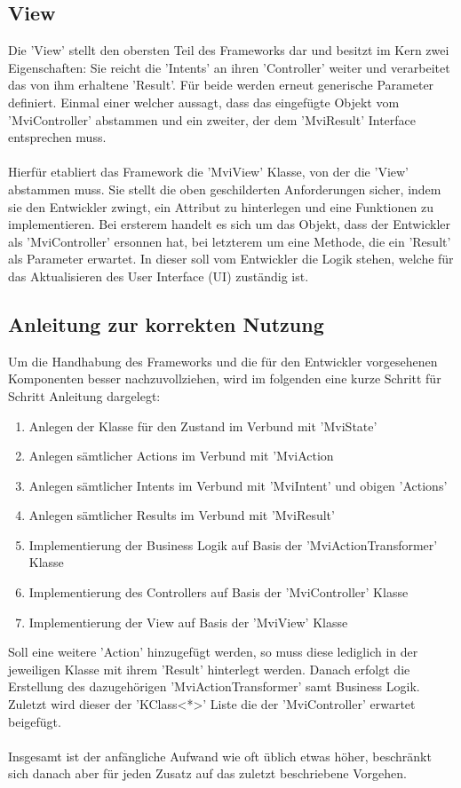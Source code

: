 \subsection{View}
Die 'View' stellt den obersten Teil des Frameworks dar und besitzt im Kern zwei Eigenschaften: Sie reicht die 'Intents' an ihren 'Controller' weiter und verarbeitet das von ihm erhaltene 'Result'. Für beide werden erneut generische Parameter definiert. Einmal einer welcher aussagt, dass das eingefügte Objekt vom 'MviController' abstammen und ein zweiter, der dem 'MviResult' Interface entsprechen muss.
\\\\
Hierfür etabliert das Framework die 'MviView' Klasse, von der die 'View' abstammen muss. Sie stellt die oben geschilderten Anforderungen sicher, indem sie den Entwickler zwingt, ein Attribut zu hinterlegen und eine Funktionen zu implementieren. Bei ersterem handelt es sich um das Objekt, dass der Entwickler als 'MviController' ersonnen hat, bei letzterem um eine Methode, die ein 'Result' als Parameter erwartet. In dieser soll vom Entwickler die Logik stehen, welche für das Aktualisieren des User Interface (UI) zuständig ist. 

\subsection{Anleitung zur korrekten Nutzung}
Um die Handhabung des Frameworks und die für den Entwickler vorgesehenen Komponenten besser nachzuvollziehen, wird im folgenden eine kurze Schritt für Schritt Anleitung dargelegt:
\begin{enumerate}
	\item Anlegen der Klasse für den Zustand im Verbund mit 'MviState'
	\item Anlegen sämtlicher Actions im Verbund mit 'MviAction
	\item Anlegen sämtlicher Intents im Verbund mit 'MviIntent' und obigen 'Actions'
	\item Anlegen sämtlicher Results im Verbund mit 'MviResult'
	\item Implementierung der Business Logik auf Basis der 'MviActionTransformer' Klasse
	\item Implementierung des Controllers auf Basis der 'MviController' Klasse
	\item Implementierung der View auf Basis der 'MviView' Klasse
\end{enumerate}
\bigskip
Soll eine weitere 'Action' hinzugefügt werden, so muss diese lediglich in der jeweiligen Klasse mit ihrem 'Result' hinterlegt werden. Danach erfolgt die Erstellung des dazugehörigen 'MviActionTransformer' samt Business Logik. Zuletzt wird dieser der 'KClass<*>' Liste die der 'MviController' erwartet beigefügt.
\\\\
Insgesamt ist der anfängliche Aufwand wie oft üblich etwas höher, beschränkt sich danach aber für jeden Zusatz auf das zuletzt beschriebene Vorgehen.
